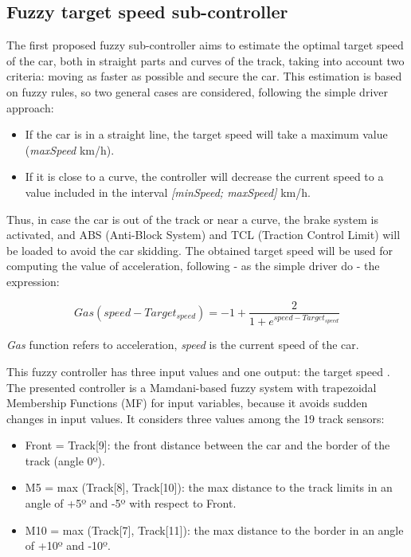 \documentclass[runningheads,a4paper]{llncs}
\begin{document}

\subsection{Fuzzy target speed sub-controller}

The first proposed fuzzy sub-controller aims to estimate the optimal target speed of the car, both in straight parts and curves of the track, taking into account two criteria: moving as faster as possible and secure the car. This estimation is based on fuzzy rules, so two general cases are considered, following the simple driver approach:

\begin{itemize}
	\item If the car is in a straight line, the target speed will take a maximum value (\textit{maxSpeed} km/h).
	\item If it is close to a curve, the controller will decrease the current speed to a value included in the interval \textit{[minSpeed; maxSpeed]} km/h.
\end{itemize}

Thus, in case the car is out of the track or near a curve, the brake system is activated, and ABS (Anti-Block System) and TCL (Traction Control Limit) will be loaded to avoid the car skidding. The obtained target speed will be used for computing the value of acceleration, following - as the simple driver do - the expression:

\begin{equation}	
Gas(speed-Target_{speed})=-1+\frac{2}{1+e^{speed-Target_{speed}}}	
\end{equation}

\textit{Gas} function refers to acceleration, \textit{speed} is the current speed of the car.

This fuzzy controller has three input values and one output: the target speed .
The presented controller is a Mamdani-based fuzzy system \cite{iancu2012} with trapezoidal Membership Functions (MF) for input variables, because it avoids sudden changes in input values. It considers three values among the 19 track sensors:

\begin{itemize}
	\item Front = Track[9]: the front distance between the car and the border of the track (angle 0º).
	\item M5 = max (Track[8], Track[10]): the max distance to the track limits in an angle of +5º and -5º with respect to Front.
	\item M10 = max (Track[7], Track[11]): the max distance to the border in an angle of +10º and -10º.
\end{itemize}
\end{document}
